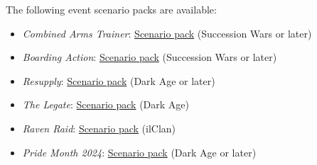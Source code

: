 The following event scenario packs are available:

\begin{itemize}

\item \emph{Combined Arms Trainer}: \href{https://raw.githubusercontent.com/Eudicods/outworlds-wastes-legacy/rules-pdf/combined-arms-trainer.pdf}{Scenario pack} (Succession Wars or later)

\item \emph{Boarding Action}: \href{https://raw.githubusercontent.com/Eudicods/outworlds-wastes-legacy/rules-pdf/boarding-action.pdf}{Scenario pack} (Succession Wars or later)

\item \emph{Resupply}: \href{https://raw.githubusercontent.com/Eudicods/outworlds-wastes-legacy/rules-pdf/resupply.pdf}{Scenario pack} (Dark Age or later)

\item \emph{The Legate}: \href{https://raw.githubusercontent.com/Eudicods/outworlds-wastes-legacy/rules-pdf/the-legate.pdf}{Scenario pack} (Dark Age)

\item \emph{Raven Raid}: \href{https://raw.githubusercontent.com/Eudicods/outworlds-wastes-legacy/rules-pdf/raven-raid.pdf}{Scenario pack} (ilClan)

\item \emph{Pride Month 2024}: \href{https://raw.githubusercontent.com/Eudicods/outworlds-wastes-legacy/rules-pdf/pride-2024.pdf}{Scenario pack} (Dark Age or later)

\end{itemize}
